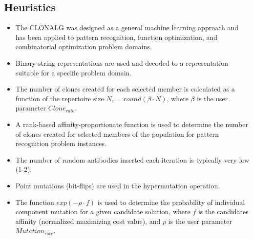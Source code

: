 \subsection{Heuristics}
\begin{itemize}
	\item The CLONALG was designed as a general machine learning approach and has been applied to pattern recognition, function optimization, and combinatorial optimization problem domains.
	\item Binary string representations are used and decoded to a representation suitable for a specific problem domain.
	\item The number of clones created for each selected member is calculated as a function of the repertoire size $N_c=round(\beta \cdot N)$, where $\beta$ is the user parameter $Clone_{rate}$. 
	\item A rank-based affinity-proportionate function is used to determine the number of clones created for selected members of the population for pattern recognition problem instances.
	\item The number of random antibodies inserted each iteration is typically very low (1-2).
	\item Point mutations (bit-flips) are used in the hypermutation operation.
	\item The function $exp(-\rho \cdot f)$ is used to determine the probability of individual component mutation for a given candidate solution, where $f$ is the candidates affinity (normalized maximizing cost value), and $\rho$ is the user parameter $Mutation_{rate}$.
\end{itemize}

